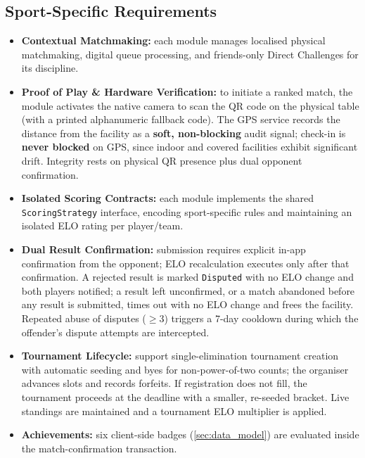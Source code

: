 \documentclass{configurations/polimi3i_thesis}
\renewcommand{\_}{\textunderscore\allowbreak}
\begin{document}
\subsection{Sport-Specific Requirements}

\begin{itemize}
    \item \textbf{Contextual Matchmaking:} each module manages localised physical matchmaking, digital queue processing, and friends-only Direct Challenges for its discipline.
    \item \textbf{Proof of Play \& Hardware Verification:} to initiate a ranked match, the module activates the native camera to scan the QR code on the physical table (with a printed alphanumeric fallback code). The GPS service records the distance from the facility as a \textbf{soft, non-blocking} audit signal; check-in is \textbf{never blocked} on GPS, since indoor and covered facilities exhibit significant drift. Integrity rests on physical QR presence plus dual opponent confirmation.
    \item \textbf{Isolated Scoring Contracts:} each module implements the shared \texttt{ScoringStrategy} interface, encoding sport-specific rules and maintaining an isolated ELO rating per player/team.
    \item \textbf{Dual Result Confirmation:} submission requires explicit in-app confirmation from the opponent; ELO recalculation executes only after that confirmation. A rejected result is marked \texttt{Disputed} with no ELO change and both players notified; a result left unconfirmed, or a match abandoned before any result is submitted, times out with no ELO change and frees the facility. Repeated abuse of disputes ($\geq 3$) triggers a 7-day cooldown during which the offender's dispute attempts are intercepted.
    \item \textbf{Tournament Lifecycle:} support single-elimination tournament creation with automatic seeding and byes for non-power-of-two counts; the organiser advances slots and records forfeits. If registration does not fill, the tournament proceeds at the deadline with a smaller, re-seeded bracket. Live standings are maintained and a tournament ELO multiplier is applied.
    \item \textbf{Achievements:} six client-side badges (\cref{sec:data_model}) are evaluated inside the match-confirmation transaction.
\end{itemize}

\end{document}
